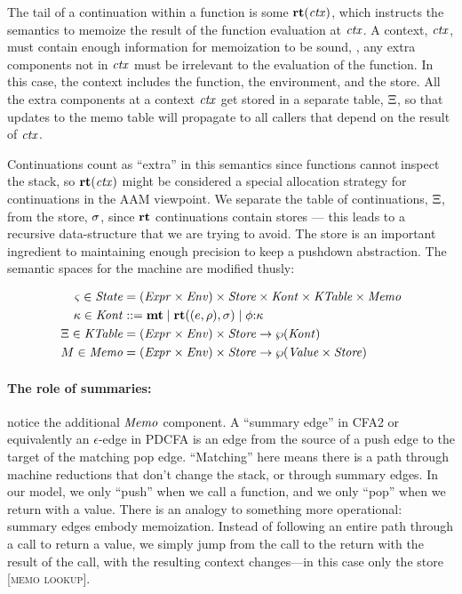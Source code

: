 The tail of a continuation within a function is some $\mathbf{rt}(\mathit{ctx})$, which instructs the semantics to memoize the result of the function evaluation at $\mathit{ctx}$.
%
A context, $\mathit{ctx}$, must contain enough information for memoization to be sound, \ie, any extra components not in $\mathit{ctx}$ must be irrelevant to the evaluation of the function.
%
In this case, the context includes the function, the environment, and the store.
%
All the extra components at a context $\mathit{ctx}$ get stored in a separate table, $\Xi$, so that updates to the memo table will propagate to all callers that depend on the result of $\mathit{ctx}$.

Continuations count as ``extra'' in this semantics since functions cannot inspect the stack, so $\mathbf{rt}(\mathit{ctx})$ might be considered a special allocation strategy for continuations in the AAM viewpoint.
%
We separate the table of continuations, $\Xi$, from the store, $\sigma$, since $\mathbf{rt}$ continuations contain stores --- this leads to a recursive data-structure that we are trying to avoid.
%
The store is an important ingredient to maintaining enough precision to keep a pushdown abstraction.
%
The semantic spaces for the machine are modified thusly:

\begin{align*}
  \varsigma \in \mathit{State} &= (\mathit{Expr} \times \mathit{Env}) \times \mathit{Store} \times \mathit{Kont} \times \mathit{KTable} \times \mathit{Memo} \\
  \kappa \in \mathit{Kont} &::= \mathbf{mt} \mathrel{\mid} \mathbf{rt}((e,\rho),\sigma) \mathrel{\mid} \phi{\tt :} \kappa \\
  \Xi \in \mathit{KTable} &= (\mathit{Expr} \times \mathit{Env})\times \mathit{Store} \to \wp(\mathit{Kont}) \\
  M \in \mathit{Memo} &= (\mathit{Expr} \times \mathit{Env})\times \mathit{Store} \to \wp(\mathit{Value} \times \mathit{Store})
\end{align*}

\paragraph{The role of summaries:} notice the additional $\mathit{Memo}$ component.
%
A ``summary edge'' in CFA2 or equivalently an $\epsilon$-edge in PDCFA is an edge from the source of a push edge to the target of the matching pop edge.
%
``Matching'' here means there is a path through machine reductions that don't change the stack, or through summary edges.
%
In our model, we only ``push'' when we call a function, and we only ``pop'' when we return with a value.
%
There is an analogy to something more operational: summary edges embody memoization.
%
Instead of following an entire path through a call to return a value, we simply jump from the call to the return with the result of the call, with the resulting context changes---in this case only the store \textsc{[memo lookup]}.

